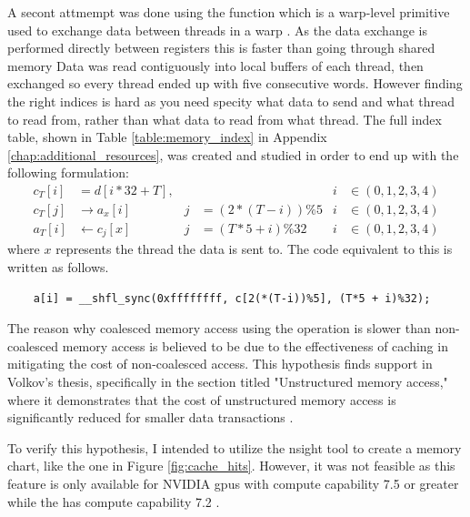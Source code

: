 A secont attmempt was done using the  function which is a warp-level primitive used to exchange data between threads in a warp \cite{linUsingCUDAWarpLevel2018}.
As the data exchange is performed directly between registers this is faster than going through shared memory \cite{linUsingCUDAWarpLevel2018}
Data was read contiguously into local buffers of each thread, then exchanged so every thread ended up with five consecutive words.
However finding the right indices is hard as you need specity what data to send and what thread to read from, rather than what data to read from what thread.
The full index table, shown in Table \ref{table:memory_index} in Appendix \ref{chap:additional_resources}, was created and studied in order to end up with the following formulation:
\begin{align}
    c_T[i] & = d[i*32+T],       &   &                   & i & \in (0,1,2,3,4) \\
    c_T[j] & \rightarrow a_x[i] & j & = (2 * (T -i))\%5 & i & \in (0,1,2,3,4) \\
    a_T[i] & \leftarrow c_j[x]  & j & = (T*5 + i)\%32   & i & \in (0,1,2,3,4)
    \label{eq:contiguous_reading_shfl}
\end{align}
where $x$ represents the thread the data is sent to.
The code equivalent to this is written as follows.
\begin{verbatim}
    a[i] = __shfl_sync(0xffffffff, c[2(*(T-i))%5], (T*5 + i)%32);
\end{verbatim}



The reason why coalesced memory access using the  operation is slower than non-coalesced memory access is believed to be due to the effectiveness of caching in mitigating the cost of non-coalesced access. This hypothesis finds support in Volkov's thesis, specifically in the section titled "Unstructured memory access," where it demonstrates that the cost of unstructured memory access is significantly reduced for smaller data transactions \cite[Sec 6.7]{volkovLatencyHiding2016}.

To verify this hypothesis, I intended to utilize the \gls{nsight} tool to create a memory chart, like the one in Figure \ref{fig:cache_hits}. However, it was not feasible as this feature is only available for NVIDIA \glspl{gpu} with compute capability 7.5 or greater while the \jx has compute capability 7.2 \cite{crovellaUsingNsightCompute2019}\cite{CUDA2023}.


